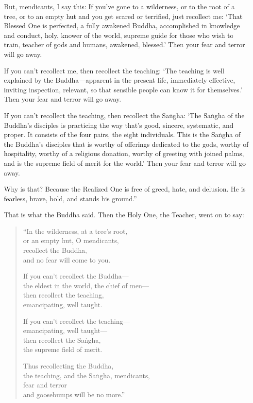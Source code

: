 \documentclass[12pt,openany]{book}%
\begin{document}
But, mendicants, I say this: If you’ve gone to a wilderness, or to the root of a tree, or to an empty hut and you get scared or terrified, just recollect me: ‘That Blessed One is perfected, a fully awakened Buddha, accomplished in knowledge and conduct, holy, knower of the world, supreme guide for those who wish to train, teacher of gods and humans, awakened, blessed.’ Then your fear and terror will go away. 

If you can’t recollect me, then recollect the teaching: ‘The teaching is well explained by the Buddha—apparent in the present life, immediately effective, inviting inspection, relevant, so that sensible people can know it for themselves.’ Then your fear and terror will go away. 

If you can’t recollect the teaching, then recollect the \textsanskrit{Saṅgha}: ‘The \textsanskrit{Saṅgha} of the Buddha’s disciples is practicing the way that’s good, sincere, systematic, and proper. It consists of the four pairs, the eight individuals. This is the \textsanskrit{Saṅgha} of the Buddha’s disciples that is worthy of offerings dedicated to the gods, worthy of hospitality, worthy of a religious donation, worthy of greeting with joined palms, and is the supreme field of merit for the world.’ Then your fear and terror will go away. 

Why is that? Because the Realized One is free of greed, hate, and delusion. He is fearless, brave, bold, and stands his ground.” 

That is what the Buddha said. Then the Holy One, the Teacher, went on to say: 

\begin{verse}%
“In the wilderness, at a tree’s root, \\
or an empty hut, O mendicants, \\
recollect the Buddha, \\
and no fear will come to you. 

If you can’t recollect the Buddha—\\
the eldest in the world, the chief of men—\\
then recollect the teaching, \\
emancipating, well taught. 

If you can’t recollect the teaching—\\
emancipating, well taught—\\
then recollect the \textsanskrit{Saṅgha}, \\
the supreme field of merit. 

Thus recollecting the Buddha, \\
the teaching, and the \textsanskrit{Saṅgha}, mendicants, \\
fear and terror \\
and goosebumps will be no more.” 

%
\end{verse}
\end{document}
